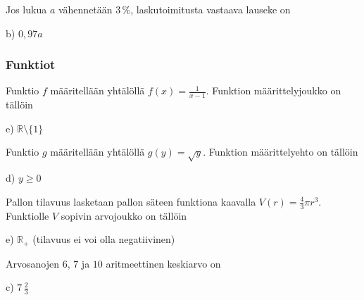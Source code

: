 \begin{tehtava}
Jos lukua $a$ vähennetään $3$\,\%, laskutoimitusta vastaava lauseke on
	\begin{vastaus}
b) $0,97a$
	\end{vastaus}
\end{tehtava}

\subsubsection*{Funktiot}

\begin{tehtava}
Funktio $f$ määritellään yhtälöllä $f(x)=\frac{1}{x-1}$. Funktion määrittelyjoukko on tällöin
    \begin{vastaus}
	 e) $\mathbb{R}\setminus \lbrace 1 \rbrace$
    \end{vastaus}
\end{tehtava}

\begin{tehtava}
Funktio $g$ määritellään yhtälöllä $g(y)=\sqrt{y}$. Funktion määrittelyehto on tällöin
    \begin{vastaus}
	 d) $y\geq 0$
    \end{vastaus}
\end{tehtava}

\begin{tehtava}
Pallon tilavuus lasketaan pallon säteen funktiona kaavalla $V(r)=\frac{4}{3}\pi r^3$. Funktiolle $V$ sopivin arvojoukko on tällöin
	\begin{vastaus}
	e) $\mathbb{R}_+$ (tilavuus ei voi olla negatiivinen)
	\end{vastaus}
\end{tehtava}

	\begin{tehtava}
Arvosanojen $6$, $7$ ja $10$ aritmeettinen keskiarvo on
	\begin{vastaus}
	c) $7\,\frac{2}{3}$
	\end{vastaus}
\end{tehtava}

